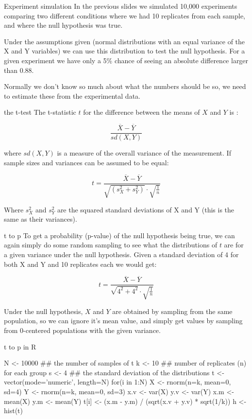\documentclass[pdf]{beamer}
\begin{document}
\begin{frame}{Experiment simulation}
  In the previous slides we simulated 10,000 experiments comparing two
  different conditions where we had 10 replicates from each sample, and where
  the null hypothesis was true.

  Under the assumptions given (normal distributions with an equal variance of the X and Y
  variables) we can use this distribution to test the null hypothesis. For
  a given experiment we have only a 5\% chance of seeing an absolute
  difference larger than 0.88.

  Normally we don't know so much about what the numbers should be so, we need
  to estimate these from the experimental data.
\end{frame}

\begin{frame}{the t-test}
  The t-statistic $t$ for the difference between the means of $X$ and $Y$
  is :

  $$
  \frac{\overline{X} - \overline{Y}}{sd(X,Y)}
  $$
  
  where $sd(X,Y)$ is a measure of the overall variance of the measurement. 
  If sample sizes and variances can be assumed to be equal:

  $$
  t = \frac{\overline{X} - \overline{Y}}{ \sqrt{(s^2_{X} +
      s^2_{Y})}\cdot\sqrt{\frac{1}{n}}}
  $$
  
  Where $s^2_X$ and $s^2_Y$ are the squared standard deviations of X and Y
  (this is the same as their variances).
  
\end{frame}

\begin{frame}{t to p}
  To get a probability (p-value) of the null hypothesis being true, we can again
  simply do some random sampling to see what the distributions of $t$ are for
  a given variance under the null hypothesis. Given a standard deviation of 4
  for both X and Y and 10 replicates each we would get:
  
  $$
  t = \frac{\overline{X} - \overline{Y}}{\sqrt{4^2 +
      4^2}\cdot\sqrt{\frac{1}{n}}}
  $$

  Under the null hypothesis, $X$ and $Y$ are obtained by sampling from
  the same population, so we can ignore it's mean value, and simply get values
  by sampling from 0-centered populations with the given variance.
\end{frame}

\begin{frame}[fragile]{t to p in R}
  \begin{rcode}
    N <- 10000 ## the number of samples of t
    k <- 10    ## number of replicates (n) for each group
    s <- 4     ## the standard deviation of the distributions
    t <- vector(mode='numeric', length=N)
    for(i in 1:N){
      X <- rnorm(n=k, mean=0, sd=4)
      Y <- rnorm(n=k, mean=0, sd=3)
      x.v <- var(X)
      y.v <- var(Y)
      x.m <- mean(X)
      y.m <- mean(Y)
      t[i] <- (x.m - y.m) / (sqrt(x.v + y.v) * sqrt(1/k))
    }
    h <- hist(t)
  \end{rcode}
\end{frame}
\end{document}

